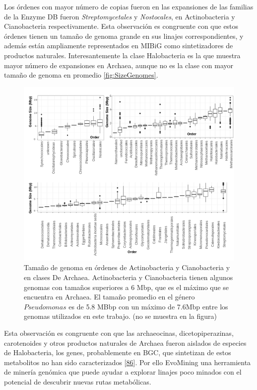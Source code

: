 \documentclass[12pt,twoside]{reedthesis}
\begin{document}
  Los órdenes con mayor número de copias fueron en las expansiones de las
  familias de la Enzyme DB fueron \emph{Streptomycetales} y
  \emph{Nostocales}, en Actinobacteria y Cianobacteria respectivamente.
  Esta observación es congruente con que estos órdenes tienen un tamaño de
  genoma grande en sus linajes correspondientes, y además están
  ampliamente representados en MIBiG como sintetizadores de productos
  naturales. Interesantemente la clase Halobacteria es la que muestra
  mayor número de expansiones en Archaea, aunque no es la clase con mayor
  tamaño de genoma en promedio \autoref{fig:SizeGenomes}.
  
  \begin{figure}[h!tbp]
  \centering
  \includegraphics[angle = 0,scale = .5]{chapter2/Genomesize.png}
  \caption[Tamaño de genoma en órdenes de Actinobacteria y Cianobacteria y en clases De Archaea.]{\footnotesize{Tamaño de genoma en órdenes de Actinobacteria y Cianobacteria y en clases De Archaea. Actinobacteria y Cianobacteria tienen algunos genomas con tamaños superiores a 6 Mbp, que es el máximo que se encuentra en Archaea. El tamaño promedio en el género $Pseudomonas$ es de 5.8 MBbp con un máximo de 7.6Mbp entre los genomas utilizados en este trabajo.
  (no se muestra en la figura)}}
  \label{fig:SizeGenomes}
  \end{figure}
  
  Esta observación es congruente con que las archaeocinas,
  dicetopiperazinas, carotenoides y otros productos naturales de Archaea
  fueron aislados de especies de Halobacteria, los genes, probablemente en
  BGC, que sintetizan de estos metabolitos no han sido caracterizados
  {[}\protect\hyperlink{ref-charlesworth_untapped_natural_products_Archaea_2015}{86}{]}.
  Por ello EvoMining una herramienta de minería genómica que puede ayudar
  a explorar linajes poco minados con el potencial de descubrir nuevas
  rutas metabólicas.
  
\end{document}
